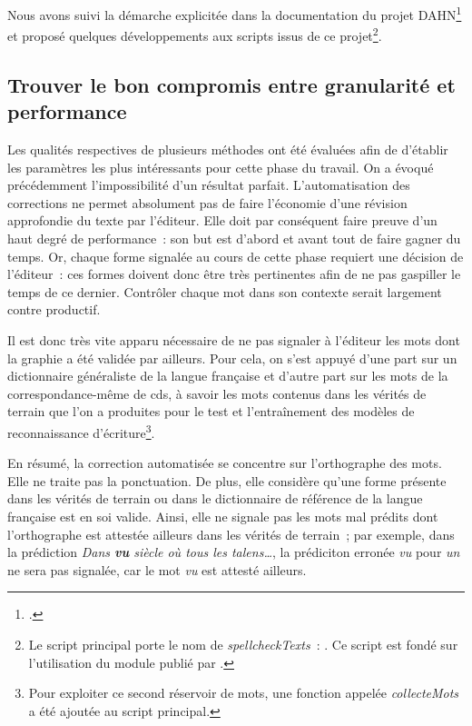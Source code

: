 \documentclass[a4paper,12pt,twoside]{book}
\begin{document}
			Nous avons suivi la démarche explicitée dans la documentation du projet DAHN\footcite{chiffoleauHowPostOCRCorrection2022} et proposé quelques développements aux scripts issus de ce projet\footnote{Le script principal porte le nom de \textit{spellcheckTexts}~: \cite{biaySpellcheckTextsPy2022}. Ce script est fondé sur l'utilisation du module publié par \cite{barrusPyspellcheckerPurePython}.}.
					
			\subsection{Trouver le bon compromis entre granularité et performance}
				Les qualités respectives de plusieurs méthodes ont été évaluées afin de d'établir les paramètres les plus intéressants pour cette phase du travail. On a évoqué précédemment l'impossibilité d'un résultat parfait. L'automatisation des corrections ne permet absolument pas de faire l'économie d'une révision approfondie du texte par l'éditeur. Elle doit par conséquent faire preuve d'un haut degré de performance~: son but est d'abord et avant tout de faire gagner du temps. Or, chaque forme signalée au cours de cette phase requiert une décision de l'éditeur~: ces formes doivent donc être très pertinentes afin de ne pas gaspiller le temps de ce dernier. Contrôler chaque mot dans son contexte serait largement contre productif.
				
				Il est donc très vite apparu nécessaire de ne pas signaler à l'éditeur les mots dont la graphie a été validée par ailleurs. Pour cela, on s'est appuyé d'une part sur un dictionnaire généraliste de la langue française et d'autre part sur les mots de la correspondance-même de \gls{cds}, à savoir les mots contenus dans les vérités de terrain que l'on a produites pour le test et l'entraînement des modèles de reconnaissance d'écriture\footnote{Pour exploiter ce second réservoir de mots, une fonction appelée \textit{collecteMots} a été ajoutée au script principal.}.
			
				En résumé, la correction automatisée se concentre sur l'orthographe des mots. Elle ne traite pas la ponctuation. De plus, elle considère qu'une forme présente dans les vérités de terrain ou dans le dictionnaire de référence de la langue française est en soi valide. Ainsi, elle ne signale pas les mots mal prédits dont l'orthographe est attestée ailleurs dans les vérités de terrain~; par exemple, dans la prédiction \textit{Dans \textbf{vu} siècle où tous les talens…}, la prédiciton erronée \textit{vu} pour \textit{un} ne sera pas signalée, car le mot \textit{vu} est attesté ailleurs.
					
\end{document}
